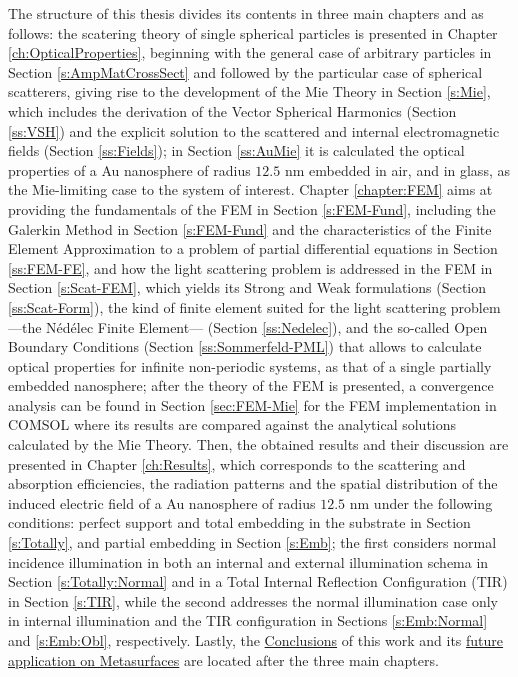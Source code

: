 The structure of this thesis divides its contents in three main chapters and as follows: the scatering theory of single spherical particles is presented in Chapter \ref{ch:OpticalProperties}, beginning with the general case of arbitrary particles in Section \ref{s:AmpMatCrossSect} and followed by the particular case of spherical scatterers,  giving rise to the development of the Mie Theory in Section \ref{s:Mie}, which includes the derivation of the Vector Spherical Harmonics (Section \ref{ss:VSH}) and the explicit solution to the scattered and internal electromagnetic fields (Section \ref{ss:Fields}); in Section \ref{ss:AuMie} it is calculated the optical properties of a Au nanosphere of radius $12.5$ nm embedded in air, and in glass, as the Mie-limiting case to the system of interest. Chapter \ref{chapter:FEM} aims at providing the fundamentals of the FEM in Section \ref{s:FEM-Fund}, including the Galerkin Method in Section \ref{s:FEM-Fund} and the characteristics of the Finite Element Approximation to a problem of partial differential equations in Section \ref{ss:FEM-FE}, and how the light scattering problem is addressed in the FEM in Section \ref{s:Scat-FEM}, which yields its Strong and Weak formulations (Section \ref{ss:Scat-Form}), the kind of finite element suited for the light scattering problem ---the Nédélec Finite Element--- (Section  \ref{ss:Nedelec}), and the so-called Open Boundary Conditions (Section  \ref{ss:Sommerfeld-PML}) that allows to calculate optical properties for infinite non-periodic  systems, as that of a single partially embedded nanosphere; after the theory of the FEM is presented, a convergence analysis can be found in Section \ref{sec:FEM-Mie} for the FEM implementation in COMSOL where its results are compared against the analytical solutions calculated by the Mie Theory. Then, the obtained results and their discussion are presented in Chapter \ref{ch:Results}, which corresponds to the scattering and absorption efficiencies, the radiation patterns and the spatial distribution of the induced electric field of a Au nanosphere of radius $12.5$ nm under the following conditions: perfect support and total embedding in the substrate in Section \ref{s:Totally}, and partial embedding in Section \ref{s:Emb}; the first considers normal incidence illumination in both an internal and external illumination schema in Section \ref{s:Totally:Normal} and in a Total Internal Reflection Configuration (TIR) in Section \ref{s:TIR}, while the second addresses the normal illumination case only in internal illumination and the TIR configuration in Sections \ref{s:Emb:Normal} and \ref{s:Emb:Obl}, respectively. Lastly, the \hyperref[ch:Conclusions]{Conclusions} of this work and its \hyperref[s:FWork]{future application on Metasurfaces} are located after the three main chapters.	


